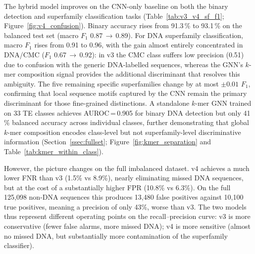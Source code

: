 \documentclass[12pt]{article}
\begin{document}
The hybrid model improves on the CNN-only baseline on both the binary detection and superfamily classification tasks (Table~\ref{tab:v3_v4_sf_f1}; Figure~\ref{fig:v4_confusion}). Binary accuracy rises from 91.3\,\% to 93.1\,\% on the balanced test set (macro $F_1$ 0.87\,$\to$\,0.89). For DNA superfamily classification, macro $F_1$ rises from 0.91 to 0.96, with the gain almost entirely concentrated in DNA/CMC ($F_1$ 0.67\,$\to$\,0.92): in v3 the CMC class suffers low precision (0.51) due to confusion with the generic DNA-labelled sequences, whereas the GNN's $k$-mer composition signal provides the additional discriminant that resolves this ambiguity. The five remaining specific superfamilies change by at most $\pm0.01$ $F_1$, confirming that local sequence motifs captured by the CNN remain the primary discriminant for those fine-grained distinctions. A standalone $k$-mer GNN trained on 33 TE classes achieves AUROC\,=\,0.905 for binary DNA detection but only 41\,\% balanced accuracy across individual classes, further demonstrating that global $k$-mer composition encodes class-level but not superfamily-level discriminative information (Section~\ref{ssec:fullset}; Figure~\ref{fig:kmer_separation} and Table~\ref{tab:kmer_within_class}).

However, the picture changes on the full imbalanced dataset. v4 achieves a much lower FNR than v3 (1.5\% vs 8.9\%), nearly eliminating missed DNA sequences, but at the cost of a substantially higher FPR (10.8\% vs 6.3\%). On the full 125{,}098 non-DNA sequences this produces 13{,}480 false positives against 10{,}100 true positives, meaning a precision of only 43\%, worse than v3. The two models thus represent different operating points on the recall--precision curve: v3 is more conservative (fewer false alarms, more missed DNA); v4 is more sensitive (almost no missed DNA, but substantially more contamination of the superfamily classifier).
\end{document}

